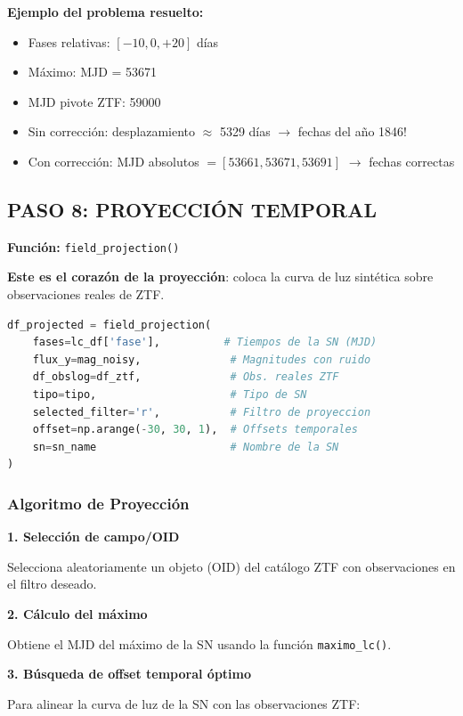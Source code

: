 \documentclass[11pt,a4paper]{article}
\begin{document}
\textbf{Ejemplo del problema resuelto:}
\begin{itemize}
    \item Fases relativas: $[-10, 0, +20]$ días
    \item Máximo: MJD = 53671
    \item MJD pivote ZTF: 59000
    \item Sin corrección: desplazamiento $\approx$ 5329 días $\rightarrow$ fechas del año 1846!
    \item Con corrección: MJD absolutos $= [53661, 53671, 53691]$ $\rightarrow$ fechas correctas
\end{itemize}

\subsection{PASO 8: PROYECCIÓN TEMPORAL }

\textbf{Función:} \texttt{field\_projection()}

\textbf{Este es el corazón de la proyección}: coloca la curva de luz sintética sobre observaciones reales de ZTF.

\begin{lstlisting}[language=Python, caption=Proyección temporal]
df_projected = field_projection(
    fases=lc_df['fase'],          # Tiempos de la SN (MJD)
    flux_y=mag_noisy,              # Magnitudes con ruido
    df_obslog=df_ztf,              # Obs. reales ZTF
    tipo=tipo,                     # Tipo de SN
    selected_filter='r',           # Filtro de proyeccion
    offset=np.arange(-30, 30, 1),  # Offsets temporales
    sn=sn_name                     # Nombre de la SN
)
\end{lstlisting}

\subsubsection{Algoritmo de Proyección}

\textbf{1. Selección de campo/OID}

Selecciona aleatoriamente un objeto (OID) del catálogo ZTF con observaciones en el filtro deseado.

\textbf{2. Cálculo del máximo}

Obtiene el MJD del máximo de la SN usando la función \texttt{maximo\_lc()}.

\textbf{3. Búsqueda de offset temporal óptimo}

Para alinear la curva de luz de la SN con las observaciones ZTF:
\end{document}
